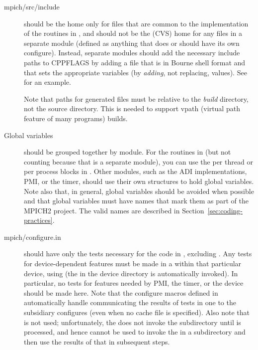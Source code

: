\documentclass{article}
\begin{document}
\begin{description}
\item[mpich/src/include] should be the home only for files that are
  common to 
the implementation of the routines in , and should not be
the 
(CVS) home for any files in a separate module (defined as anything that does
or should have its own configure).  
Instead, separate modules should add the necessary include paths to
CPPFLAGS by adding a  file that is in Bourne shell
format and that sets the appropriate variables (by \emph{adding}, not
replacing, values).
See  for an
example. 

Note that paths for generated files must be relative to the \emph{build}
directory, not the source directory.  This is needed to support vpath
(virtual path feature of many  programs) builds.

\item[Global variables] should be grouped together by module.  For the routines
in  (but not counting  because that is
a separate 
module), you can use the per thread or per process blocks in
.  Other modules, such as the ADI implementations,
PMI, 
or the timer, should use their own structures to hold global
variables. 
Note also that, in general, global variables should be avoided when
possible and that global variables must have names that mark them as
part of the MPICH2 project.  The valid names are described in
Section~\ref{sec:coding-practices}. 

\item[mpich/configure.in] should have only the tests necessary for the
  code in 
, excluding  .  Any tests for
device-dependent features 
must be made in a  within that particular device, using
 (the  in the
  device directory 
is automatically invoked).  In particular, no tests for features needed by
PMI, the 
timer, or the device should be made here.  Note that the configure
macros defined in  automatically handle communicating the
results of tests in one  to the subsidiary configures
(even when no cache file is specified).  Also note that
   is not used; unfortunately, the
   does not invoke the subdirectory
   until  is processed, and hence
  cannot be used to invoke the  in a subdirectory and
  then use the results of that  in subsequent steps.


\end{description}
\end{document}
